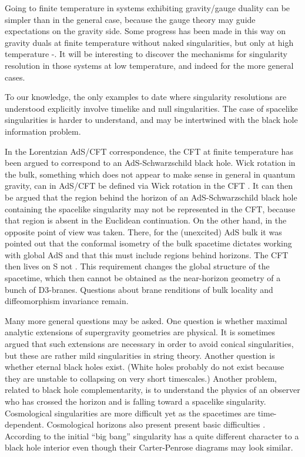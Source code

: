 \documentclass[a4paper,12pt]{amsproc}
\numberwithin{equation}{section}
\def\bR{\mathbf{R}}
\begin{document}
Going to finite temperature in systems exhibiting gravity/gauge
duality can be simpler than in the general case, because the gauge
theory may guide expectations on the gravity side.  Some progress has
been made in this way on gravity duals at finite temperature without
naked singularities, but only at high temperature
\cite{highT1}-\cite{highT5}.  It will be interesting to discover the
mechanisms for singularity resolution in those systems at low
temperature, and indeed for the more general cases.

To our knowledge, the only examples to date where singularity
resolutions are understood explicitly involve timelike and null
singularities.  The case of spacelike singularities is harder to
understand, and may be intertwined with the black hole information
problem.

In the Lorentzian AdS/CFT correspondence, the CFT at finite
temperature has been argued to correspond to an AdS-Schwarzschild
black hole.  Wick rotation in the bulk, something which does not
appear to make sense in general in quantum gravity, can in AdS/CFT be
defined via Wick rotation in the CFT \cite{bkl}.  It can then be
argued that the region behind the horizon of an AdS-Schwarzschild
black hole containing the spacelike singularity may not be represented
in the CFT, because that region is absent in the Euclidean
continuation.  On the other hand, in \cite{horoog} the opposite point
of view was taken.  There, for the (unexcited) AdS bulk it was pointed
out that the conformal isometry of the bulk spacetime dictates working
with global AdS and that this must include regions behind horizons.
The CFT then lives on S\coordHE{} not \myHighlight{$\bR^3$}\coordHE{}.  This requirement changes the
global structure of the spacetime, which then cannot be obtained as
the near-horizon geometry of a bunch of D3-branes. Questions about
brane renditions of bulk locality and diffeomorphism invariance
remain.

Many more general questions may be asked.  One question is whether
maximal analytic extensions of supergravity geometries are physical.
It is sometimes argued that such extensions are necessary in order to
avoid conical singularities, but these are rather mild singularities
in string theory.  Another question is whether eternal black holes
exist.  (White holes probably do not exist because they are unstable
to collapsing on very short timescales.)  Another problem, related to
black hole complementarity, is to understand the physics of an
observer who has crossed the horizon and is falling toward a spacelike
singularity.  Cosmological singularities are more difficult yet as the
spacetimes are time-dependent.  Cosmological horizons also present
present basic difficulties \cite{raph,willy,lenny}.  According to
\cite{tomb} the initial ``big bang'' singularity has a quite different
character to a black hole interior even though their Carter-Penrose
diagrams may look similar.
\end{document}
